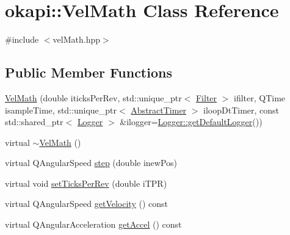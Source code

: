 \hypertarget{classokapi_1_1VelMath}{}\section{okapi\+::Vel\+Math Class Reference}
\label{classokapi_1_1VelMath}


{\ttfamily \#include $<$vel\+Math.\+hpp$>$}

\subsection*{Public Member Functions}
\begin{DoxyCompactItemize}
\item 
\mbox{\hyperlink{classokapi_1_1VelMath_a47804f85fa8beb088602811217d0a996}{Vel\+Math}} (double iticks\+Per\+Rev, std\+::unique\+\_\+ptr$<$ \mbox{\hyperlink{classokapi_1_1Filter}{Filter}} $>$ ifilter, Q\+Time isample\+Time, std\+::unique\+\_\+ptr$<$ \mbox{\hyperlink{classokapi_1_1AbstractTimer}{Abstract\+Timer}} $>$ iloop\+Dt\+Timer, const std\+::shared\+\_\+ptr$<$ \mbox{\hyperlink{classokapi_1_1Logger}{Logger}} $>$ \&ilogger=\mbox{\hyperlink{classokapi_1_1Logger_a5053cf778b4b55acba788a3797dc96d2}{Logger\+::get\+Default\+Logger}}())
\item 
virtual \mbox{\hyperlink{classokapi_1_1VelMath_a555b678899ad8e231543d6f206ae0db6}{$\sim$\+Vel\+Math}} ()
\item 
virtual Q\+Angular\+Speed \mbox{\hyperlink{classokapi_1_1VelMath_a4c6e14c7f2054512b59a30736f61982f}{step}} (double inew\+Pos)
\item 
virtual void \mbox{\hyperlink{classokapi_1_1VelMath_a0a95837a35bfb2702a170da95daba559}{set\+Ticks\+Per\+Rev}} (double i\+T\+PR)
\item 
virtual Q\+Angular\+Speed \mbox{\hyperlink{classokapi_1_1VelMath_ae366b0895bfac15e986448aa9c22b26c}{get\+Velocity}} () const
\item 
virtual Q\+Angular\+Acceleration \mbox{\hyperlink{classokapi_1_1VelMath_ac47c50d2fc6035739607801d1aa2272d}{get\+Accel}} () const
\end{DoxyCompactItemize}
